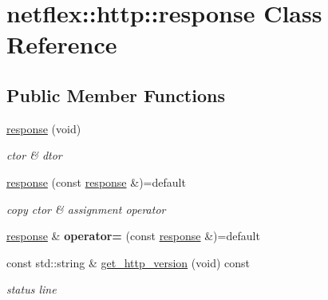 \hypertarget{classnetflex_1_1http_1_1response}{}\section{netflex\+:\+:http\+:\+:response Class Reference}
\label{classnetflex_1_1http_1_1response}
\subsection*{Public Member Functions}
\begin{DoxyCompactItemize}
\item 
\mbox{\label{classnetflex_1_1http_1_1response_a73aab521e1e08f804a58fd79b562f0bc}} 
\hyperlink{classnetflex_1_1http_1_1response_a73aab521e1e08f804a58fd79b562f0bc}{response} (void)
\begin{DoxyCompactList}\small\item\em ctor \& dtor \end{DoxyCompactList}\item 
\mbox{\label{classnetflex_1_1http_1_1response_a3b45f99380312143e915f6e820ec8cec}} 
\hyperlink{classnetflex_1_1http_1_1response_a3b45f99380312143e915f6e820ec8cec}{response} (const \hyperlink{classnetflex_1_1http_1_1response}{response} \&)=default
\begin{DoxyCompactList}\small\item\em copy ctor \& assignment operator \end{DoxyCompactList}\item 
\mbox{\label{classnetflex_1_1http_1_1response_a9ebb5c421d490002b7a441d3be9b9c09}} 
\hyperlink{classnetflex_1_1http_1_1response}{response} \& {\bfseries operator=} (const \hyperlink{classnetflex_1_1http_1_1response}{response} \&)=default
\item 
\mbox{\label{classnetflex_1_1http_1_1response_a1f6462ae67d321210e3acba1cbc91674}} 
const std\+::string \& \hyperlink{classnetflex_1_1http_1_1response_a1f6462ae67d321210e3acba1cbc91674}{get\+\_\+http\+\_\+version} (void) const
\begin{DoxyCompactList}\small\item\em status line \end{DoxyCompactList}\item 

\end{DoxyCompactItemize}
